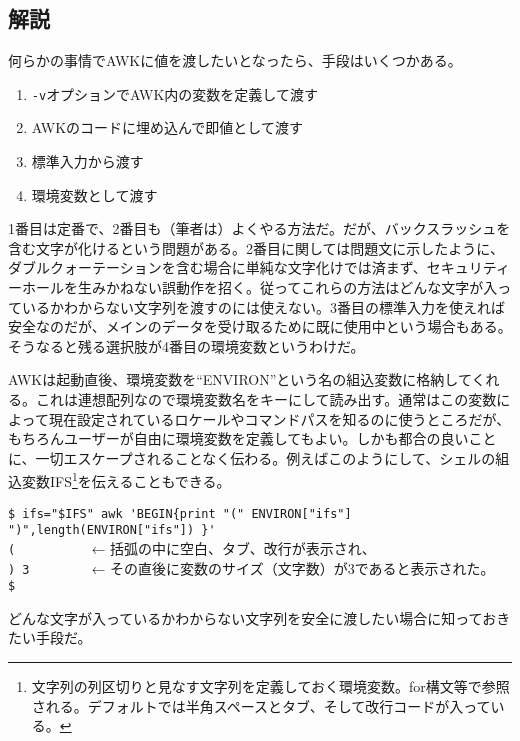 \subsection*{解説}

何らかの事情でAWKに値を渡したいとなったら、手段はいくつかある。
\begin{enumerate}
  \item \verb|-v|オプションでAWK内の変数を定義して渡す
  \item AWKのコードに埋め込んで即値として渡す
  \item 標準入力から渡す
  \item 環境変数として渡す
\end{enumerate}
1番目は定番で、2番目も（筆者は）よくやる方法だ。だが、バックスラッシュを含む文字が化けるという問題がある。2番目に関しては問題文に示したように、ダブルクォーテーションを含む場合に単純な文字化けでは済まず、セキュリティーホールを生みかねない誤動作を招く。従ってこれらの方法はどんな文字が入っているかわからない文字列を渡すのには使えない。3番目の標準入力を使えれば安全なのだが、メインのデータを受け取るために既に使用中という場合もある。そうなると残る選択肢が4番目の環境変数というわけだ。

AWKは起動直後、環境変数を``ENVIRON''という名の組込変数に格納してくれる。これは連想配列なので環境変数名をキーにして読み出す。通常はこの変数によって現在設定されているロケールやコマンドパスを知るのに使うところだが、もちろんユーザーが自由に環境変数を定義してもよい。しかも都合の良いことに、一切エスケープされることなく伝わる。例えばこのようにして、シェルの組込変数IFS\footnote{文字列の列区切りと見なす文字列を定義しておく環境変数。for構文等で参照される。デフォルトでは半角スペースとタブ、そして改行コードが入っている。}を伝えることもできる。
\begin{screen}
	\verb!$ ifs="$IFS" awk 'BEGIN{print "(" ENVIRON["ifs"] ")",length(ENVIRON["ifs"]) }'! \return \\
	\verb!(          ! ← 括弧の中に空白、タブ、改行が表示され、 \\
	\verb!) 3        ! ← その直後に変数のサイズ（文字数）が3であると表示された。 \\
	\verb!$ !
\end{screen}

どんな文字が入っているかわからない文字列を安全に渡したい場合に知っておきたい手段だ。